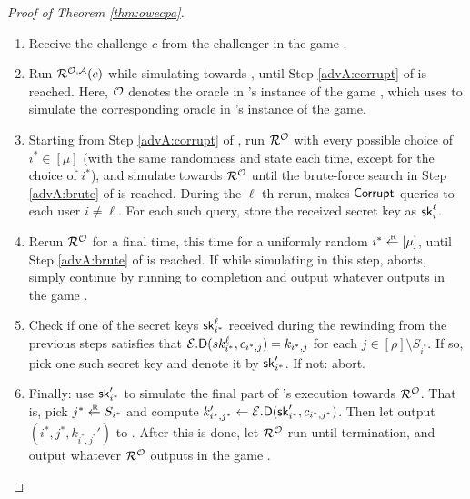 \begin{proof}[Proof of Theorem \ref{thm:owecpa}]
  \begin{enumerate}[itemsep=0.1cm]
    \item Receive the challenge \(c\) from the challenger in the game \Simple.
    \item Run \(\redR^{\oracle,\advA}(c)\) while simulating \advA towards \redR,
          until Step \ref{advA:corrupt} of \advA is reached.
          Here, \(\mathcal{O}\) denotes the oracle in \redM's instance of the game \Simple,
          which \redM uses to simulate the corresponding oracle in \redR's instance of the game.
    \item\label{advM:rewind} Starting from Step \ref{advA:corrupt} of \advA, run \(\redR^{\oracle}\) with every possible choice of \(i^{*} \in [\mu]\)
          (with the same randomness and state each time, except for the choice of \(i^{*}\)),
          and simulate \advA towards \(\redR^{\oracle}\)
          until the brute-force search in Step \ref{advA:brute} of \advA is reached.
          During the \(\ell\)-th rerun, \advA makes \(\mathsf{Corrupt}\)-queries to each user \(i \ne \ell\).
          For each such query, store the received secret key as \(\mathsf{sk}_{i}^{\ell}\).
    \item\label{advM:sample} Rerun \(\redR^{\oracle}\) for a final time, this time for a uniformly random \(i^{*} \sampleR [\mu]\),
          until Step \ref{advA:brute} of \advA is reached.
          If while simulating \advA in this step, \advA aborts,
          simply continue by running \redR to completion
          and output whatever \redR outputs in the game \Simple.
    \item\label{advM:key} Check if one of the secret keys \(\mathsf{sk}_{i^{*}}^{\ell}\) received during the rewinding
          from the previous steps satisfies that
          \(\mathcal{E}.\mathsf{D}(sk_{i^{*}}^{\ell},c_{i^{*},j}) = k_{i^{*},j}\)
          for each \(j \in [\rho] \setminus S_{i^{*}}\).
          If so, pick one such secret key and denote it by \(\mathsf{sk}_{i^{*}}'\).
          If not: abort.
    \item Finally: use \(\mathsf{sk}_{i^{*}}'\) to simulate the final part of \advA's execution towards \(\redR^{\oracle}\).
          That is, pick \(j^{*} \sampleR S_{i^{*}}\)
          and compute \(k_{i^{*},j^{*}}' \leftarrow \mathcal{E}.\mathsf{D}(\mathsf{sk}_{i^{*}}',c_{i^{*},j^{*}})\).
          Then let \advA output \((i^{*},j^{*}, k_{i^{*},j^{*}}')\) to \redR.
          After this is done, let \(\redR^{\oracle}\) run until termination,
          and output whatever \(\redR^{\oracle}\) outputs in the game \Simple.
  \end{enumerate}


\end{proof}
